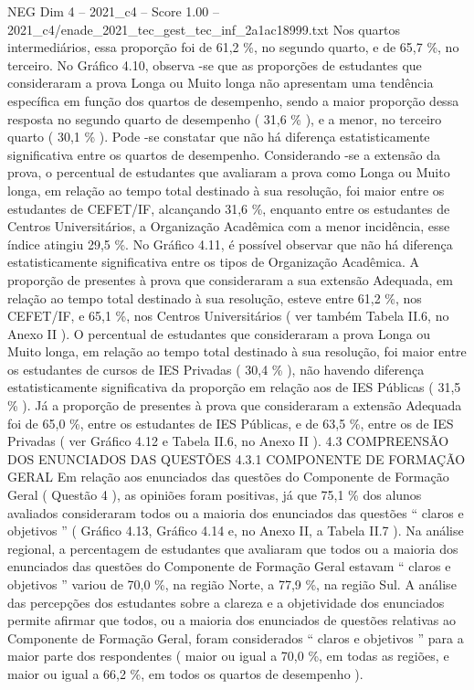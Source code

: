\begin{textsample}{NEG Dim 4 – 2021\_c4 – Score 1.00 – 2021\_c4/enade\_2021\_tec\_gest\_tec\_inf\_2a1ac18999.txt}
Nos quartos intermediários, essa proporção foi de 61,2 \%, no segundo quarto, e de 65,7 \%, no terceiro.
No Gráfico 4.10, observa -se que as proporções de estudantes que consideraram a prova Longa ou Muito longa não apresentam uma tendência específica em função dos quartos de desempenho, sendo a maior proporção dessa resposta no segundo quarto de desempenho ( 31,6 \% ), e a menor, no terceiro quarto ( 30,1 \% ).
Pode -se constatar que não há diferença estatisticamente significativa entre os quartos de desempenho.
Considerando -se a extensão da prova, o percentual de estudantes que avaliaram a prova como Longa ou Muito longa, em relação ao tempo total destinado à sua resolução, foi maior entre os estudantes de CEFET/IF, alcançando 31,6 \%, enquanto entre os estudantes de Centros Universitários, a Organização Acadêmica com a menor incidência, esse índice atingiu 29,5 \%.
No Gráfico 4.11, é possível observar que não há diferença estatisticamente significativa entre os tipos de Organização Acadêmica.
A proporção de presentes à prova que consideraram a sua extensão Adequada, em relação ao tempo total destinado à sua resolução, esteve entre 61,2 \%, nos CEFET/IF, e 65,1 \%, nos Centros Universitários ( ver também Tabela II.6, no Anexo II ).
O percentual de estudantes que consideraram a prova Longa ou Muito longa, em relação ao tempo total destinado à sua resolução, foi maior entre os estudantes de cursos de IES Privadas ( 30,4 \% ), não havendo diferença estatisticamente significativa da proporção em relação aos de IES Públicas ( 31,5 \% ).
Já a proporção de presentes à prova que consideraram a extensão Adequada foi de 65,0 \%, entre os estudantes de IES Públicas, e de 63,5 \%, entre os de IES Privadas ( ver Gráfico 4.12 e Tabela II.6, no Anexo II ). 4.3 COMPREENSÃO DOS ENUNCIADOS DAS QUESTÕES 4.3.1 COMPONENTE DE FORMAÇÃO GERAL Em relação aos enunciados das questões do Componente de Formação Geral ( Questão 4 ), as opiniões foram positivas, já que 75,1 \% dos alunos avaliados consideraram todos ou a maioria dos enunciados das questões “ claros e objetivos ” ( Gráfico 4.13, Gráfico 4.14 e, no Anexo II, a Tabela II.7 ).
Na análise regional, a percentagem de estudantes que avaliaram que todos ou a maioria dos enunciados das questões do Componente de Formação Geral estavam “ claros e objetivos ” variou de 70,0 \%, na região Norte, a 77,9 \%, na região Sul.
A análise das percepções dos estudantes sobre a clareza e a objetividade dos enunciados permite afirmar que todos, ou a maioria dos enunciados de questões relativas ao Componente de Formação Geral, foram considerados “ claros e objetivos ” para a maior parte dos respondentes ( maior ou igual a 70,0 \%, em todas as regiões, e maior ou igual a 66,2 \%, em todos os quartos de desempenho ).

\end{textsample}
